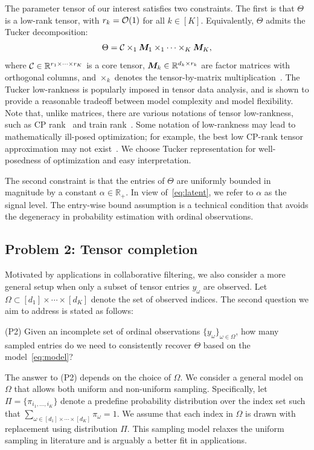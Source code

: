 \documentclass{article}
\theoremstyle{plain}
\theoremstyle{definition}
\begin{document}
The parameter tensor of our interest satisfies two constraints. The first is that $\Theta$ is a low-rank tensor, with $r_k=\mathcal{O}(1)$ for all $k\in[K]$. Equivalently, $\Theta$ admits the Tucker decomposition:
\begin{equation}\label{eq:Tucker}
\Theta=\mathcal{C}\times_1\bm M_1\times_1 \cdots \times_K \bm M_K,
\end{equation}
where $\mathcal{C}\in\mathbb{R}^{r_1\times \cdots \times r_K}$ is a core tensor, $\bm M_k\in\mathbb{R}^{d_k\times r_k}$ are factor matrices with orthogonal columns, and $\times_k$ denotes the tensor-by-matrix multiplication~\cite{kolda2009tensor}. The Tucker low-rankness is popularly imposed in tensor data analysis, and is shown to provide a reasonable tradeoff between model complexity and model flexibility. Note that, unlike matrices, there are various notations of tensor low-rankness, such as CP rank~\cite{hitchcock1927expression} and train rank~\cite{oseledets2011tensor}. Some notation of low-rankness may lead to mathematically ill-posed optimization; for example, the best low CP-rank tensor approximation may not exist~\cite{de2008tensor}. We choose Tucker representation for well-posedness of optimization and easy interpretation.

The second constraint is that the entries of $\Theta$ are uniformly bounded in magnitude by a constant $\alpha \in \mathbb{R}_{+}$. In view of~\eqref{eq:latent}, we refer to $\alpha$ as the signal level. The entry-wise bound assumption is a technical condition that avoids the degeneracy in probability estimation with ordinal observations.

\subsection{Problem 2: Tensor completion}
Motivated by applications in collaborative filtering, we also consider a more general setup when only a subset of tensor entries $y_\omega$ are observed. Let $\Omega\subset[d_1]\times \cdots\times[d_K]$ denote the set of observed indices. The second question we aim to address is stated as follows:

(P2) Given an incomplete set of ordinal observations $\{y_{\omega}\}_{\omega\in\Omega}$, how many sampled entries do we need to consistently recover $\Theta$ based on the model~\eqref{eq:model}?

The answer to (P2) depends on the choice of $\Omega$. We consider a general model on $\Omega$ that allows both uniform and non-uniform sampling. Specifically, let $\Pi=\{\pi_{i_1,\ldots,i_K}\}$ denote a predefine probability distribution over the index set such that $\sum_{\omega\in[d_1]\times \cdots \times [d_K]} \pi_\omega =1$. We assume that each index in $\Omega$ is drawn with replacement using distribution $\Pi$. This sampling model relaxes the uniform sampling in literature and is arguably a better fit in applications.
\end{document}
